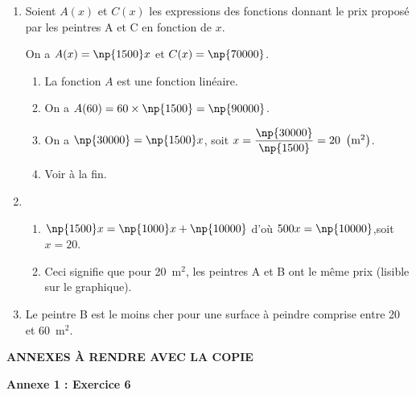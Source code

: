 \begin{enumerate}[resume]
\item Soient $A(x)$ et $C(x)$ les expressions des fonctions donnant le prix proposé par les peintres A et C en fonction de $x$.

On a $A(x) = \np{1500}x$ et $C(x)= \np{70000}$.
	\begin{enumerate}
		\item %
La fonction $A$ est une fonction linéaire.
		\item %
On a $A(60) = 60 \times \np{1500} = \np{90000}$.
		\item %
On a $\np{30000} = \np{1500}x$, soit $x = \dfrac{\np{30000}}{\np{1500}} = 20~\left(\text{m}^2\right)$.
		\item %
Voir à la fin.
	\end{enumerate}
\item 
	\begin{enumerate}
		\item %
$\np{1500} x = \np{1000} x + \np{10000}$ d'où $500x = \np{10000}$,soit $x = 20$.
		\item %
Ceci signifie que pour 20~m$^2$, les peintres A et B ont le même prix (lisible sur le graphique).
	\end{enumerate}
\item %
Le peintre B est le moins cher pour une surface à peindre comprise entre 20 et 60~m$^2$.
\end{enumerate}

\begin{center}
\textbf{ANNEXES À RENDRE AVEC LA COPIE}

\bigskip

\textbf{Annexe 1 : Exercice 6}
 
\medskip
 
\end{center}
\vspace{0,5cm}

